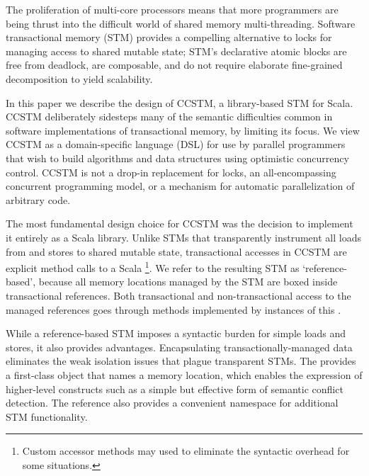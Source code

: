 The proliferation of multi-core processors means that more programmers are
being thrust into the difficult world of shared memory multi-threading.
Software transactional memory (STM) provides a compelling alternative to
locks for managing access to shared mutable state; STM's declarative
atomic blocks are free from deadlock, are composable, and do not
require elaborate fine-grained decomposition to yield scalability.


In this paper we describe the design of CCSTM, a library-based STM
for Scala.  CCSTM deliberately sidesteps many of the 
semantic difficulties common in software implementations of transactional
memory, by limiting its focus.  We view CCSTM as a domain-specific language
(DSL)
for use by parallel programmers that wish to build algorithms and data
structures using optimistic concurrency control.  CCSTM is not a drop-in replacement for
locks, an all-encompassing concurrent programming model, or a mechanism
for automatic parallelization of arbitrary code.

The most fundamental design choice for CCSTM was the decision to
implement it entirely as a Scala library.  Unlike STMs that transparently
instrument
all loads from and stores to shared mutable state, transactional accesses in CCSTM are explicit
method calls to a Scala \footnote{Custom accessor methods
may used to eliminate the syntactic overhead for some situations.}.
We refer to the resulting STM as `reference-based', because all memory
locations managed by the STM are boxed inside transactional references.
Both transactional and non-transactional access to the managed references
goes through methods implemented by instances of this .

While a reference-based STM imposes a syntactic burden for simple loads and
stores, it also provides advantages.  Encapsulating transactionally-managed
data eliminates the weak isolation issues that plague transparent STMs.
The  provides
a first-class object that names a memory location, which enables the
expression of higher-level constructs such as a simple but effective form of
semantic conflict detection.
The reference also provides a convenient
namespace for additional STM functionality.

